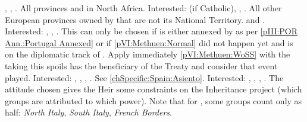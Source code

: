 \FRA, \AUS, \SPA.
 All provinces and \Presidios in North Africa.
Interested: \FRA (if Catholic), \ENG, \SPA.
 All other European provinces owned by \SPA that are not
its National Territory.
 \provinceGibraltar and \provinceBaleares.
Interested: \ENG, \HOL, \SPA.
 This can only be chosen if
\paysportugal is either annexed by \HIS as per \ref{pIII:POR Ann.:Portugal
  Annexed} or if \ref{pVI:Methuen:Normal} did not happen yet and \paysportugal
is on the diplomatic track of \HIS. Apply immediately \ref{pVI:Methuen:WoSS}
with the \MAJ taking this spoils has the beneficiary of the Treaty and
consider that event played. Interested: \FRA, \ENG, \HOL, \SPA.
\bparag[Asiento] See \ref{chSpecific:Spain:Asiento}. Interested: \FRA, \ENG,
\HOL, \SPA.
\aparag The attitude chosen gives the Heir some constraints on the Inheritance
project (which groups are attributed to which power).
\bparag Note that for \AUS, some groups count only as half: \emph{North
  Italy}, \emph{South Italy}, \emph{French Borders}.

